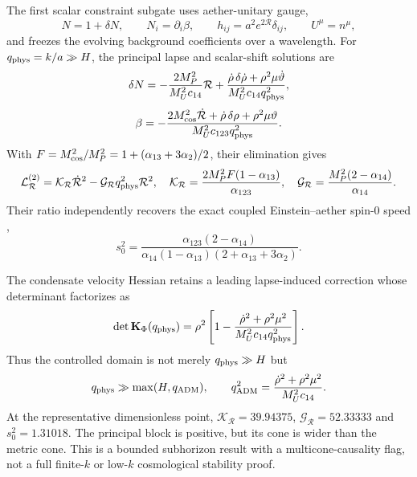 The first scalar constraint subgate uses aether-unitary gauge,
\begin{equation}
 N=1+\delta N,\qquad N_i=\partial_i\beta,\qquad
 h_{ij}=a^2e^{2\mathcal R}\delta_{ij},\qquad U^\mu=n^\mu,
 \label{eq:scalar-adm-gauge}
\end{equation}
and freezes the evolving background coefficients over a wavelength.  For
$q_{\rm phys}=k/a\gg H$, the principal lapse and scalar-shift solutions are
\begin{equation}
 \delta N=-\frac{2M_P^2}{M_U^2c_{14}}\mathcal R
 +\frac{\dot\rho\,\delta\dot\rho+\rho^2\mu\dot\vartheta}
 {M_U^2c_{14}q_{\rm phys}^2},
 \label{eq:scalar-adm-lapse}
\end{equation}
\begin{equation}
 \beta=-\frac{2M_{\rm cos}^2\dot{\mathcal R}
 +\dot\rho\,\delta\rho+\rho^2\mu\vartheta}
 {M_U^2c_{123}q_{\rm phys}^2}.
 \label{eq:scalar-adm-shift}
\end{equation}
With $F=M_{\rm cos}^2/M_P^2
=1+(\alpha_{13}+3\alpha_2)/2$, their elimination gives
\begin{equation}
 \mathcal L_{\mathcal R}^{(2)}
 =\mathcal K_{\mathcal R}\dot{\mathcal R}^2
 -\mathcal G_{\mathcal R}q_{\rm phys}^2\mathcal R^2,
 \quad
 \mathcal K_{\mathcal R}
 =\frac{2M_P^2F(1-\alpha_{13})}{\alpha_{123}},
 \quad
 \mathcal G_{\mathcal R}
 =\frac{M_P^2(2-\alpha_{14})}{\alpha_{14}}.
 \label{eq:scalar-adm-reduced}
\end{equation}
Their ratio independently recovers the exact coupled Einstein--aether spin-0
speed \cite{elingjacobsonmattingly2004},
\begin{equation}
 s_0^2=
 \frac{\alpha_{123}(2-\alpha_{14})}
 {\alpha_{14}(1-\alpha_{13})(2+\alpha_{13}+3\alpha_2)}.
 \label{eq:scalar-adm-spin-zero}
\end{equation}

The condensate velocity Hessian retains a leading lapse-induced correction
whose determinant factorizes as
\begin{equation}
 \det\mathbf K_\Phi(q_{\rm phys})
 =\rho^2\left[
 1-\frac{\dot\rho^2+\rho^2\mu^2}
 {M_U^2c_{14}q_{\rm phys}^2}\right].
 \label{eq:scalar-adm-condensate-determinant}
\end{equation}
Thus the controlled domain is not merely $q_{\rm phys}\gg H$ but
\begin{equation}
 q_{\rm phys}\gg\max(H,q_{\rm ADM}),\qquad
 q_{\rm ADM}^2=
 \frac{\dot\rho^2+\rho^2\mu^2}{M_U^2c_{14}}.
 \label{eq:scalar-adm-validity}
\end{equation}
At the representative dimensionless point,
$\mathcal K_{\mathcal R}=39.94375$,
$\mathcal G_{\mathcal R}=52.33333$ and $s_0^2=1.31018$.  The principal block
is positive, but its cone is wider than the metric cone.  This is a bounded
subhorizon result with a multicone-causality flag, not a full finite-$k$ or
low-$k$ cosmological stability proof.

